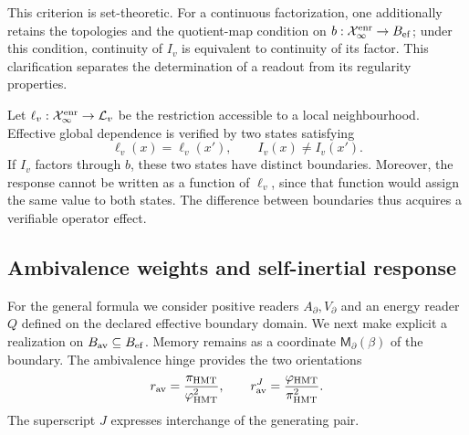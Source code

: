This criterion is set-theoretic. For a continuous factorization, one
additionally retains the topologies and the quotient-map condition
on \(b:\mathcal X_\infty^{\rm enr}\to B_{\rm ef}\); under this condition,
continuity of \(I_v\) is equivalent to continuity of its factor. This clarification
separates the determination of a readout from its regularity properties.

Let \(\ell_v:\mathcal X_\infty^{\rm enr}\to\mathcal L_v\) be the
restriction accessible to a local neighbourhood. Effective global
dependence is verified by two states satisfying
\begin{equation}
 \ell_v(x)=\ell_v(x'),\qquad I_v(x)\neq I_v(x').
 \label{vii:eq:observador-testigo-global}
\end{equation}
If \(I_v\) factors through \(b\), these two states have distinct
boundaries. Moreover, the response cannot be written as a function of
\(\ell_v\), since that function would assign the same value to both states.
The difference between boundaries thus acquires a verifiable operator effect.

\subsection{Ambivalence weights and self-inertial response}
\label{vii:sec:observador-ambivalencia}

For the general formula we consider positive readers
\(A_\partial,V_\partial\) and an energy reader \(Q\)
defined on the declared effective boundary domain.
We next make explicit a realization on
\(B_{\rm av}\subseteq B_{\rm ef}\). Memory remains as a coordinate
\(\mathsf M_\partial(\beta)\) of the boundary. The ambivalence
hinge provides the two orientations
\[
 r_{\rm av}=\frac{\pi_{\rm HMT}}{\varphi_{\rm HMT}^2},\qquad
 r_{\rm av}^{J}=\frac{\varphi_{\rm HMT}}{\pi_{\rm HMT}^2}.
\]
The superscript \(J\) expresses interchange of the generating pair.

